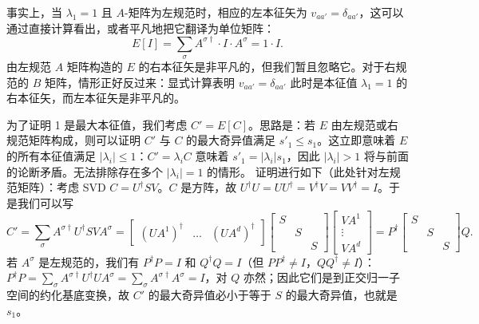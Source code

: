 事实上，当 $\lambda_1=1$ 且 $A$-矩阵为左规范时，相应的左本征矢为 $v_{aa'}=\delta_{aa'}$，这可以通过直接计算看出，或者平凡地把它翻译为单位矩阵：
\begin{equation}
E[I] = \sum_\sigma A^{\sigma\dagger} \cdot I \cdot A^{\sigma} = 1 \cdot I .
\end{equation}
由左规范 $A$ 矩阵构造的 $E$ 的右本征矢是非平凡的，但我们暂且忽略它。对于右规范的 $B$ 矩阵，情形正好反过来：显式计算表明 $v_{aa'}=\delta_{aa'}$ 此时是本征值 $\lambda_1=1$ 的右本征矢，而左本征矢是非平凡的。

为了证明 1 是最大本征值\cite{Weichselbaum05}，我们考虑 $C' = E[C]$。思路是：若 $E$ 由左规范或右规范矩阵构成，则可以证明 $C'$ 与 $C$ 的最大奇异值满足 $s'_1 \leq s_1$。这立即意味着 $E$ 的所有本征值满足 $|\lambda_i| \leq 1$：$C'=\lambda_i C$ 意味着 $s'_1 = |\lambda_i| s_1$，因此 $|\lambda_i|>1$ 将与前面的论断矛盾。无法排除存在多个 $|\lambda_i|=1$ 的情形。
证明进行如下（此处针对左规范矩阵）：考虑 SVD $C = U^\dagger S V$。$C$ 是方阵，故 $U^\dagger U = UU^\dagger = V^\dagger V = VV^\dagger = I$。于是我们可以写
\begin{equation}
C' = \sum_\sigma A^{\sigma\dagger} U^\dagger S V A^{\sigma} =
\left[ \begin{array}{ccc} (UA^1)^\dagger & \ldots  & (UA^d)^\dagger \end{array} \right]
\left[ \begin{array}{ccc} S & & \\ & S & \\ & & S \end{array} \right]
\left[ \begin{array}{c} VA^1 \\ \vdots \\ VA^d \end{array} \right] = P^\dagger \left[ \begin{array}{ccc} S & & \\ & S & \\ & & S \end{array} \right] Q .
\end{equation}
若 $A^\sigma$ 是左规范的，我们有 $P^\dagger P = I$ 和 $Q^\dagger Q = I$（但 $PP^\dagger \neq I$，$QQ^\dagger \neq I$）：$P^\dagger P =\sum_\sigma A^{\sigma\dagger} U^\dagger U A^\sigma = \sum_\sigma A^{\sigma\dagger} A^\sigma = I$，对 $Q$ 亦然；因此它们是到正交归一子空间的约化基底变换，故 $C'$ 的最大奇异值必小于等于 $S$ 的最大奇异值，也就是 $s_1$。

